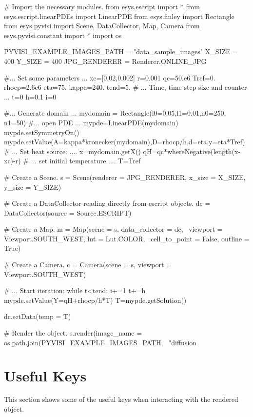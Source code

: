 \begin{python}
# Import the necessary modules.
from esys.escript import *
from esys.escript.linearPDEs import LinearPDE
from esys.finley import Rectangle
from esys.pyvisi import Scene, DataCollector, Map, Camera
from esys.pyvisi.constant import *
import os

PYVISI_EXAMPLE_IMAGES_PATH = "data_sample_images"
X_SIZE = 400
Y_SIZE = 400
JPG_RENDERER = Renderer.ONLINE_JPG

#... Set some parameters ...
xc=[0.02,0.002]
r=0.001
qc=50.e6
Tref=0.
rhocp=2.6e6
eta=75.
kappa=240.
tend=5.
# ... Time, time step size and counter ...
t=0
h=0.1
i=0

#... Generate domain ...
mydomain = Rectangle(l0=0.05,l1=0.01,n0=250, n1=50)
#... open PDE ...
mypde=LinearPDE(mydomain)
mypde.setSymmetryOn()
mypde.setValue(A=kappa*kronecker(mydomain),D=rhocp/h,d=eta,y=eta*Tref)
# ... Set heat source: ....
x=mydomain.getX()
qH=qc*whereNegative(length(x-xc)-r)
# ... set initial temperature ....
T=Tref

# Create a Scene.
s = Scene(renderer = JPG_RENDERER, x_size = X_SIZE, y_size = Y_SIZE)

# Create a DataCollector reading directly from escript objects.
dc = DataCollector(source = Source.ESCRIPT)

# Create a Map.
m = Map(scene = s, data_collector = dc, \
        viewport = Viewport.SOUTH_WEST, lut = Lut.COLOR, \
        cell_to_point = False, outline = True)

# Create a Camera.
c = Camera(scene = s, viewport = Viewport.SOUTH_WEST)

# ... Start iteration:
while t<tend:
      i+=1
      t+=h
      mypde.setValue(Y=qH+rhocp/h*T)
      T=mypde.getSolution()

      dc.setData(temp = T)
      
      # Render the object.
      s.render(image_name = os.path.join(PYVISI_EXAMPLE_IMAGES_PATH, \
              "diffusion%
\end{python}

\newpage

\section{Useful Keys}
This section shows some of the useful keys when interacting with the rendered
object.

